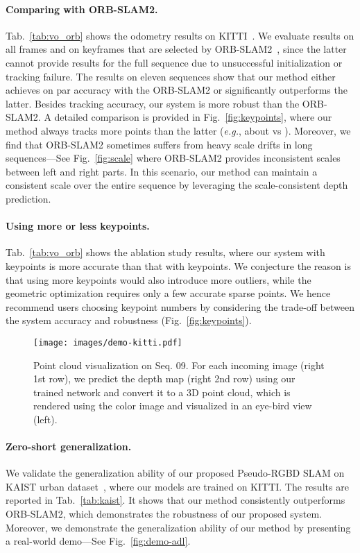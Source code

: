 \documentclass[twocolumn]{svjour3}
\renewcommand{\cite}[1]{\textcolor{blue}{\citep{#1}}}
\def\eg{\emph{e.g.}}
\newcommand{\figref}[1]{Fig.~\ref{#1}}
\newcommand{\tabref}[1]{Tab.~\ref{#1}}
\begin{document}
\paragraph{Comparing with ORB-SLAM2.}
\tabref{tab:vo_orb} shows the odometry results on KITTI~\cite{Geiger2013IJRR}.
We evaluate results on all frames and on keyframes that are selected by ORB-SLAM2~\cite{murORB2},
since the latter cannot provide results for the full sequence due to unsuccessful initialization or tracking failure.
The results on eleven sequences show that our method either achieves on par accuracy with the ORB-SLAM2 or significantly outperforms the latter.
Besides tracking accuracy, our system is more robust than the ORB-SLAM2.
A detailed comparison is provided in \figref{fig:keypoints},
where our method always tracks more points than the latter (\eg, about  vs ).
Moreover, we find that ORB-SLAM2 sometimes suffers from heavy scale drifts in long sequences---See \figref{fig:scale} where ORB-SLAM2 provides inconsistent scales between left and right parts.
In this scenario, our method can maintain a consistent scale over the entire sequence by leveraging the scale-consistent depth prediction.

\paragraph{Using more or less keypoints.} \tabref{tab:vo_orb} shows the ablation study results, where our system with  keypoints is more accurate than that with  keypoints.
We conjecture the reason is that using more keypoints would also introduce more outliers,
while the geometric optimization requires only a few accurate sparse points.
We hence recommend users choosing keypoint numbers by considering the trade-off between the system accuracy and robustness (\figref{fig:keypoints}).


\begin{figure}[t]
  \centering
  \texttt{[image: images/demo-kitti.pdf]}
  \caption{Point cloud visualization on Seq. 09.
  For each incoming image (right 1st row), we predict the depth map (right 2nd row) using our trained network 
  and convert it to a 3D point cloud, 
  which is rendered using the color image and visualized in an eye-bird view (left). 
  }\label{fig:demo-kitti}
  \vspace{-5mm}
\end{figure}


\vspace{-3mm}
\paragraph{Zero-short generalization.}
We validate the generalization ability of our proposed Pseudo-RGBD SLAM on KAIST urban dataset~\cite{jeong2019complex},
where our models are trained on KITTI.
The results are reported in \tabref{tab:kaist}.
It shows that our method consistently outperforms ORB-SLAM2,
which demonstrates the robustness of our proposed system.
Moreover, we demonstrate the generalization ability of our method by presenting a real-world demo---See \figref{fig:demo-adl}.
\end{document}
